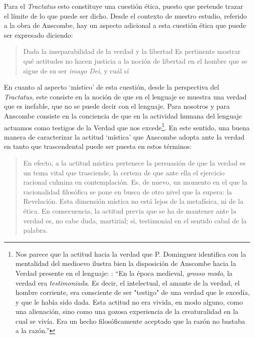 Para el \emph{Tractatus} esto constituye una cuestión ética, puesto que pretende trazar el límite de lo que puede ser dicho. Desde el contexto de nuestro estudio, referido a la obra de Anscombe, hay un aspecto adicional a esta cuestión ética que puede ser expresado diciendo: \blockquote[{\Cite[354]{dominguez2009at}}]{Dada la inseparabilidad de la verdad y la libertad \textelp{} Es pertinente \textelp{} mostrar qué actitudes  no hacen justicia a la noción de libertad en el hombre que se sigue de su ser \emph{imago Dei}, y cuál sí}. 

En cuanto al aspecto `místico' de esta cuestión, desde la perspectiva del \emph{Tractatus}, este consiste en la noción de que en el lenguaje se muestra una verdad que es inefable, que no se puede decir con el lenguaje. Para nosotros y para Anscombe consiste en la conciencia de que en la actividad humana del lenguaje actuamos como testigos de la Verdad que nos excede\footnote{Nos parece que la actitud hacia la verdad que P. Dominguez identifica con la mentalidad del medioevo ilustra bien la disposición de Anscombe hacia la Verdad presente en el lenguaje: \Cite[354-355]{dominguez2009at}: \enquote{En la época medieval, \emph{grosso modo}, la verdad era \emph{testimoniada}. Es decir, el intelectual, el amante de la verdad, el hombre corriente, era consciente de ser "testigo" de una verdad que le excedía, y que le había sido dada. Esta actitud no era vivida, en modo alguno, como una alienación, sino como una gozosa experiencia de la creaturalidad en la cual se vivía. Era un hecho filosóficamente aceptado que la razón no bastaba a la razón.}}. En este sentido, una buena manera de caracterizar la actitud `mística' que Anscombe adopta ante la verdad en tanto que trascendental puede ser puesta en estos términos: \blockquote[{\Cite[357]{dominguez2009at}}]{En efecto, a la actitud mística pertenece la persuasión de que la verdad es un tema vital que trasciende, la certeza de que ante ella el ejercicio racional culmina en contemplación. Es, de nuevo, un momento en el que la racionalidad filosófica se pone en busca de otro nivel que la supera: la Revelación. Esta dimensión mística no está lejos de la metafísica, ni de la ética. \textelp{} En consecuencia, la actitud previa que se ha de mantener ante la verdad es, no cabe duda, martirial; sí, testimonial en el sentido cabal de la palabra.}

